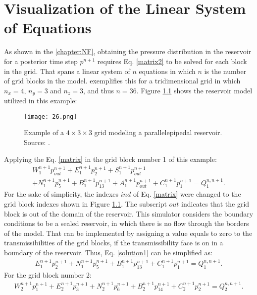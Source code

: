 \chapter{Visualization of the Linear System of Equations}
\label{appendices_vis}

As shown in the \autoref{chapter:NF}, obtaining the pressure distribution in the reservoir for a posterior time step $p^{n+1}$ requires Eq. \ref{matrix2} to be solved for each block in the grid. That spans a linear system of $n$ equations in which $n$ is the number of grid blocks in the model. \cite{Ertekin2001} exemplifies this for a tridimensional grid in which $n_x = 4$, $n_y = 3$ and $n_z = 3$, and thus $n = 36$. Figure \ref{fig:26} shows the reservoir model utilized in this example:
\begin{figure}[H]
	\centering
	\texttt{[image: 26.png]}\\
	\caption{Example of a $4 \times 3 \times 3$ grid modeling a parallelepipedal reservoir. Source: \cite{Ertekin2001}.}
	\label{fig:26}
\end{figure}
\noindent
Applying the Eq. \ref{matrix} in the grid block number 1 of this example:
\begin{multline}
\label{solution1}
W^{n+1}_{1}p^{n+1}_{out}+E^{n+1}_{1}p^{n+1}_{2}+S^{n+1}_{1}p^{n+1}_{out}\\+N^{n+1}_{1}p^{n+1}_{5}+B^{n+1}_{1}p^{n+1}_{13}+A^{n+1}_{1}p^{n+1}_{out}+C^{n+1}_{1}p^{n+1}_{1}=Q^{n, n+1}_{1}.
\end{multline}
For the sake of simplicity, the indexes $ind$ of Eq. \ref{matrix} were changed to the grid block indexes shown in Figure \ref{fig:26}. The subscript $out$ indicates that the grid block is out of the domain of the reservoir. This simulator considers the boundary conditions to be a sealed reservoir, in which there is no flow through the borders of the model. That can be implemented by assigning a value equals to zero to the transmissibilities of the grid blocks, if the transmissibility face is on in a boundary of the reservoir. Thus, Eq. \ref{solution1} can be simplified as:
\begin{multline}
\label{solution2}
E^{n+1}_{1}p^{n+1}_{2}+N^{n+1}_{1}p^{n+1}_{5}+B^{n+1}_{1}p^{n+1}_{13}+C^{n+1}_{1}p^{n+1}_{1}=Q^{n, n+1}_{1}.
\end{multline}
For the grid block number 2:
\begin{multline}
\label{solution3}
W^{n+1}_{2}p^{n+1}_{1}+E^{n+1}_{2}p^{n+1}_{3}+N^{n+1}_{2}p^{n+1}_{6}+B^{n+1}_{2}p^{n+1}_{14}+C^{n+1}_{2}p^{n+1}_{2}=Q^{n, n+1}_{2}.
\end{multline}
